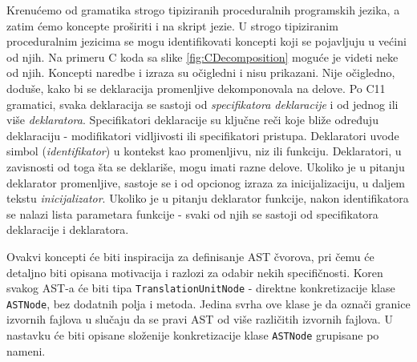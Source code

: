 Krenućemo od gramatika strogo tipiziranih proceduralnih programskih jezika, a zatim ćemo koncepte proširiti i na skript jezie. U strogo tipiziranim proceduralnim jezicima se mogu identifikovati koncepti koji se pojavljuju u većini od njih. Na primeru C koda sa slike \ref{fig:CDecomposition} moguće je videti neke od njih. Koncepti naredbe i izraza su očigledni i nisu prikazani. Nije očigledno, doduše, kako bi se deklaracija promenljive dekomponovala na delove. Po C11 gramatici, svaka deklaracija se sastoji od \emph{specifikatora deklaracije} i od jednog ili više \emph{deklaratora}. Specifikatori deklaracije su ključne reči koje bliže određuju deklaraciju - modifikatori vidljivosti ili specifikatori pristupa. Deklaratori uvode simbol (\emph{identifikator}) u kontekst kao promenljivu, niz ili funkciju. Deklaratori, u zavisnosti od toga šta se deklariše, mogu imati razne delove. Ukoliko je u pitanju deklarator promenljive, sastoje se i od opcionog izraza za inicijalizaciju, u daljem tekstu \emph{inicijalizator}. Ukoliko je u pitanju deklarator funkcije, nakon identifikatora se nalazi lista parametara funkcije - svaki od njih se sastoji od specifikatora deklaracije i deklaratora.

Ovakvi koncepti će biti inspiracija za definisanje AST čvorova, pri čemu će detaljno biti opisana motivacija i razlozi za odabir nekih specifičnosti. Koren svakog AST-a će biti tipa \texttt{TranslationUnitNode} - direktne konkretizacije klase \texttt{ASTNode}, bez dodatnih polja i metoda. Jedina svrha ove klase je da označi granice izvornih fajlova u slučaju da se pravi AST od više različitih izvornih fajlova. U nastavku će biti opisane složenije konkretizacije klase \texttt{ASTNode} grupisane po nameni. 


